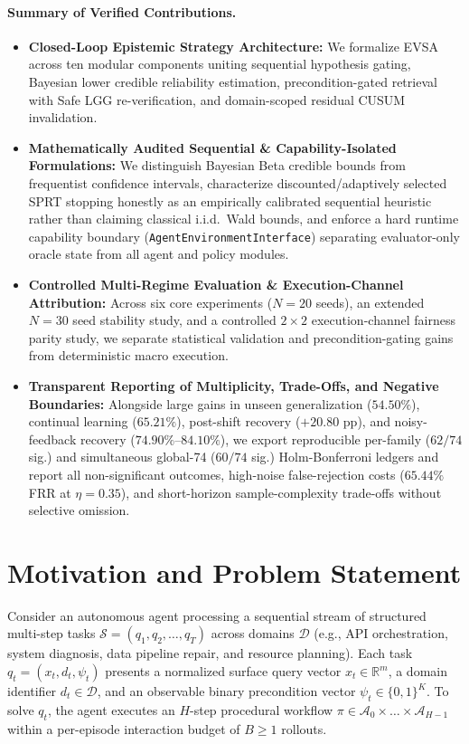 \documentclass[10pt,letterpaper]{article}
\begin{document}
\paragraph{Summary of Verified Contributions.}
\begin{itemize}
  \item \textbf{Closed-Loop Epistemic Strategy Architecture:} We formalize EVSA across ten modular components uniting sequential hypothesis gating, Bayesian lower credible reliability estimation, precondition-gated retrieval with Safe LGG re-verification, and domain-scoped residual CUSUM invalidation.
  \item \textbf{Mathematically Audited Sequential \& Capability-Isolated Formulations:} We distinguish Bayesian Beta credible bounds from frequentist confidence intervals, characterize discounted/adaptively selected SPRT stopping honestly as an empirically calibrated sequential heuristic rather than claiming classical i.i.d.\ Wald bounds, and enforce a hard runtime capability boundary (\texttt{AgentEnvironmentInterface}) separating evaluator-only oracle state from all agent and policy modules.
  \item \textbf{Controlled Multi-Regime Evaluation \& Execution-Channel Attribution:} Across six core experiments ($N=20$ seeds), an extended $N=30$ seed stability study, and a controlled $2 \times 2$ execution-channel fairness parity study, we separate statistical validation and precondition-gating gains from deterministic macro execution.
  \item \textbf{Transparent Reporting of Multiplicity, Trade-Offs, and Negative Boundaries:} Alongside large gains in unseen generalization ($54.50\%$), continual learning ($65.21\%$), post-shift recovery ($+20.80\text{ pp}$), and noisy-feedback recovery ($74.90\%\text{--}84.10\%$), we export reproducible per-family ($62/74$ sig.) and simultaneous global-74 ($60/74$ sig.) Holm-Bonferroni ledgers and report all non-significant outcomes, high-noise false-rejection costs ($65.44\%$ FRR at $\eta=0.35$), and short-horizon sample-complexity trade-offs without selective omission.
\end{itemize}

\section{Motivation and Problem Statement}
Consider an autonomous agent processing a sequential stream of structured multi-step tasks $\mathcal{S} = (q_1, q_2, \dots, q_T)$ across domains $\mathcal{D}$ (e.g., API orchestration, system diagnosis, data pipeline repair, and resource planning). Each task $q_t = (x_t, d_t, \psi_t)$ presents a normalized surface query vector $x_t \in \mathbb{R}^m$, a domain identifier $d_t \in \mathcal{D}$, and an observable binary precondition vector $\psi_t \in \{0,1\}^K$. To solve $q_t$, the agent executes an $H$-step procedural workflow $\pi \in \mathcal{A}_0 \times \dots \times \mathcal{A}_{H-1}$ within a per-episode interaction budget of $B \ge 1$ rollouts.
\end{document}

